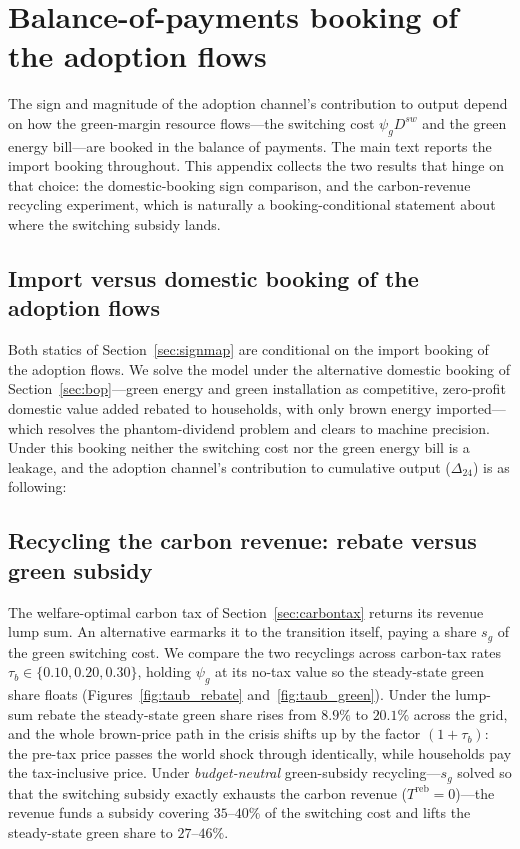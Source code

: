 \section{Balance-of-payments booking of the adoption flows}
\label{app:booking}

The sign and magnitude of the adoption channel's contribution to output depend
on how the green-margin resource flows---the switching cost $\psi_g D^{sw}$ and
the green energy bill---are booked in the balance of payments. The main text
reports the import booking throughout. This appendix collects the two results
that hinge on that choice: the domestic-booking sign comparison, and the
carbon-revenue recycling experiment, which is naturally a booking-conditional
statement about where the switching subsidy lands.

\subsection{Import versus domestic booking of the adoption flows}\label{app:booking_flows}
Both statics of Section~\ref{sec:signmap} are conditional on the import booking of the
adoption flows. We solve the model under the alternative domestic booking of
Section~\ref{sec:bop}---green energy and green installation as competitive,
zero-profit domestic value added rebated to households, with only brown energy
imported---which resolves the phantom-dividend problem and clears to machine
precision. Under this booking neither the switching cost nor the green energy
bill is a leakage, and the adoption channel's contribution to cumulative output
($\Delta_{24}$) is as following:


\subsection{Recycling the carbon revenue: rebate versus green subsidy}
\label{sec:recycle}

The welfare-optimal carbon tax of Section~\ref{sec:carbontax} returns its
revenue lump sum. An alternative earmarks it to the transition itself, paying a
share $s_g$ of the green switching cost. We compare the two recyclings across
carbon-tax rates $\tau_b\in\{0.10,0.20,0.30\}$, holding $\psi_g$ at its no-tax
value so the steady-state green share floats (Figures~\ref{fig:taub_rebate}
and~\ref{fig:taub_green}). Under the lump-sum rebate the steady-state green
share rises from $8.9\%$ to $20.1\%$ across the grid, and the whole brown-price
path in the crisis shifts up by the factor $(1+\tau_b)$: the pre-tax price
passes the world shock through identically, while households pay the
tax-inclusive price. Under \emph{budget-neutral} green-subsidy recycling---$s_g$
solved so that the switching subsidy exactly exhausts the carbon revenue
($T^{\mathrm{reb}}=0$)---the revenue funds a subsidy covering $35$--$40\%$ of
the switching cost and lifts the steady-state green share to $27$--$46\%$.

